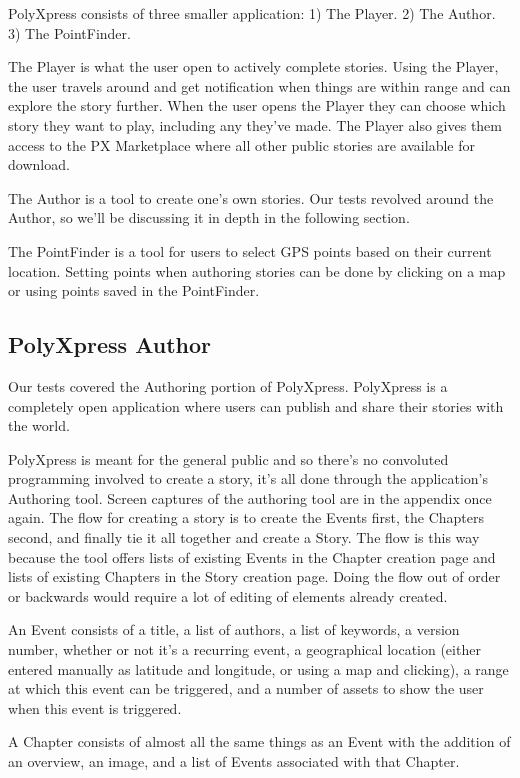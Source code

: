 \documentclass[12pt]{ucthesis}
\begin{document}
PolyXpress consists of three smaller application: 1) The Player. 2) The Author. 3) The PointFinder.

The Player is what the user open to actively complete stories. Using the Player, the user travels around and get notification when things are within range and can explore the story further. When the user opens the Player they can choose which story they want to play, including any they've made. The Player also gives them access to the PX Marketplace where all other public stories are available for download.

The Author is a tool to create one's own stories. Our tests revolved around the Author, so we'll be discussing it in depth in the following section.

The PointFinder is a tool for users to select GPS points based on their current location. Setting points when authoring stories can be done by clicking on a map or using points saved in the PointFinder.

\subsection{PolyXpress Author}
Our tests covered the Authoring portion of PolyXpress. PolyXpress is a completely open application where users can publish and share their stories with the world. 

PolyXpress is meant for the general public and so there's no convoluted programming involved to create a story, it's all done through the application's Authoring tool. Screen captures of the authoring tool are in the appendix once again. The flow for creating a story is to create the Events first, the Chapters second, and finally tie it all together and create a Story. The flow is this way because the tool offers lists of existing Events in the Chapter creation page and lists of existing Chapters in the Story creation page. Doing the flow out of order or backwards would require a lot of editing of elements already created.

An Event consists of a title, a list of authors, a list of keywords, a version number, whether or not it's a recurring event, a geographical location (either entered manually as latitude and longitude, or using a map and clicking), a range at which this event can be triggered, and a number of assets to show the user when this event is triggered.

A Chapter consists of almost all the same things as an Event with the addition of an overview, an image, and a list of Events associated with that Chapter.
\end{document}
